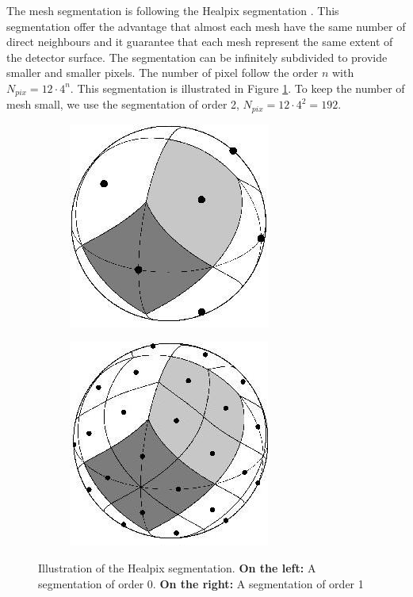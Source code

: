 \documentclass[../main.tex]{subfiles}
\begin{document}
The mesh segmentation is following the Healpix segmentation \cite{gorski_healpix_2005}. This segmentation offer the advantage that almost each mesh have the same number of direct neighbours and it guarantee that each mesh represent the same extent of the detector surface. The segmentation can be infinitely subdivided to provide smaller and smaller pixels. The number of pixel follow the order $n$ with $N_{pix} = 12 \cdot 4^n$. This segmentation is illustrated in Figure \ref{fig:jgnn:healpix}. To keep the number of mesh small, we use the segmentation of order 2, $N_{pix} = 12 \cdot 4^2 = 192$.

\begin{figure}
  \centering
  \begin{subfigure}[t]{0.48\linewidth}
    \centering
    \includegraphics[width=0.5\linewidth]{images/jgnn/healpix_0.jpg}
  \end{subfigure}
  \hfill
  \begin{subfigure}[t]{0.48\linewidth}
    \centering
    \includegraphics[width=0.5\linewidth]{images/jgnn/healpix_1.jpg}
  \end{subfigure}
  \caption{Illustration of the Healpix segmentation. \textbf{On the left:} A segmentation of order 0. \textbf{On the right:} A segmentation of order 1}
  \label{fig:jgnn:healpix}
\end{figure}
\end{document}
